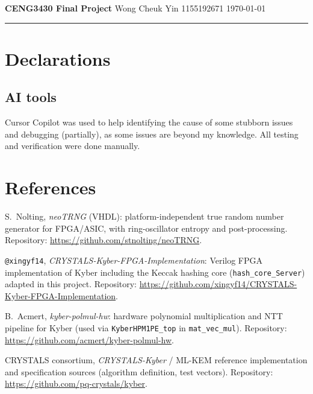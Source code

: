 \documentclass[11pt,a4paper]{article}
\begin{document}
\newpage
{\noindent\large\textbf{CENG3430 Final Project} \hfill Wong Cheuk Yin 1155192671 \hfill \today}
\vspace{0.5em}
\hrule
\vspace{0.5em}
\section{Declarations}

\subsection{AI tools}
Cursor Copilot was used to help identifying the cause of some stubborn issues and debugging (partially), as some issues are beyond my knowledge. All testing and verification were done manually.

\section{References}
\begin{enumerate}[label={[\arabic*]}, leftmargin=2.8em, itemsep=0.75em, parsep=0pt]
  \item S.~Nolting, \textit{neoTRNG} (VHDL): platform-independent true random number generator for FPGA/ASIC, with ring-oscillator entropy and post-processing. Repository: \url{https://github.com/stnolting/neoTRNG}.
  \item \texttt{@xingyf14}, \textit{CRYSTALS-Kyber-FPGA-Implementation}: Verilog FPGA implementation of Kyber including the Keccak hashing core (\texttt{hash\_core\_Server}) adapted in this project. Repository: \url{https://github.com/xingyf14/CRYSTALS-Kyber-FPGA-Implementation}.
  \item B.~Acmert, \textit{kyber-polmul-hw}: hardware polynomial multiplication and NTT pipeline for Kyber (used via \texttt{KyberHPM1PE\_top} in \texttt{mat\_vec\_mul}). Repository: \url{https://github.com/acmert/kyber-polmul-hw}.
  \item CRYSTALS consortium, \textit{CRYSTALS-Kyber} / ML-KEM reference implementation and specification sources (algorithm definition, test vectors). Repository: \url{https://github.com/pq-crystals/kyber}.
\end{enumerate}
\end{document}
